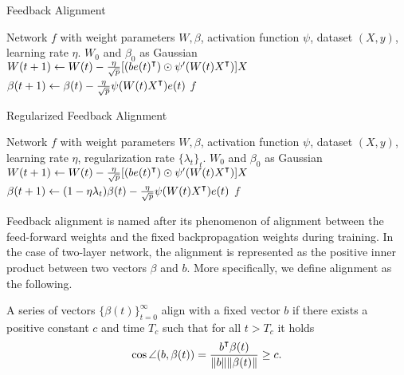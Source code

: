 \begin{minipage}{0.49\textwidth}
\begin{algorithm}[H]
\centering
\caption{Feedback Alignment}\label{algo:fa}
    \begin{algorithmic}[1]
        \Require Network $f$ with weight parameters $W,\beta$, activation function $\psi$, dataset $(X,y)$, learning rate $\eta$.
         $W_0$ and $\beta_0$ as Gaussian
            \State $W(t+1) \gets W(t) - \frac{\eta}{\sqrt p}[(b e(t)\transpose)\odot \psi'(W(t)X\transpose)] X$
            \State $\beta(t+1) \gets \beta(t) - \frac{\eta}{\sqrt p} \psi(W(t)X\transpose) e(t)$
        \EndWhile
        \State \Return $f$
    \end{algorithmic}    
\end{algorithm}
\end{minipage}
\hfill
\begin{minipage}{0.49\textwidth}
\begin{algorithm}[H]
\centering
\caption{Regularized Feedback Alignment}\label{algo:fa-reg}
    \begin{algorithmic}[1]
        \Require Network $f$ with weight parameters $W,\beta$, activation function $\psi$, dataset $(X,y)$, learning rate $\eta$, regularization rate $\{\lambda_t\}_t$.
         $W_0$ and $\beta_0$ as Gaussian
            \State $W(t+1) \gets W(t) - \frac{\eta}{\sqrt p}[(b e(t)\transpose)\odot \psi'(W(t)X\transpose)] X$
            \State $\beta(t+1) \gets (1-\eta\lambda_t)\beta(t) - \frac{\eta}{\sqrt p} \psi(W(t)X\transpose) e(t)$
        \EndWhile
        \State \Return $f$
    \end{algorithmic}    
\end{algorithm}
\end{minipage}

Feedback alignment is named after its phenomenon of alignment between the feed-forward weights and the fixed backpropagation weights during training. In the case of two-layer network, the alignment is represented as the positive inner product between two vectors $\beta$ and $b$. More specifically, we define alignment as the following.
\begin{definition}\label{def:alignment}
    A series of vectors $\{\beta(t)\}_{t=0}^\infty$ align with a fixed vector $b$ if there exists a positive constant $c$ and time $T_c$ such that for all $t > T_c$ it holds
    \begin{align*}
        \cos\angle(b, \beta(t)) = \frac{b\transpose \beta(t)}{\|b\|\|\beta(t)\|} \geq c.
    \end{align*}
\end{definition}